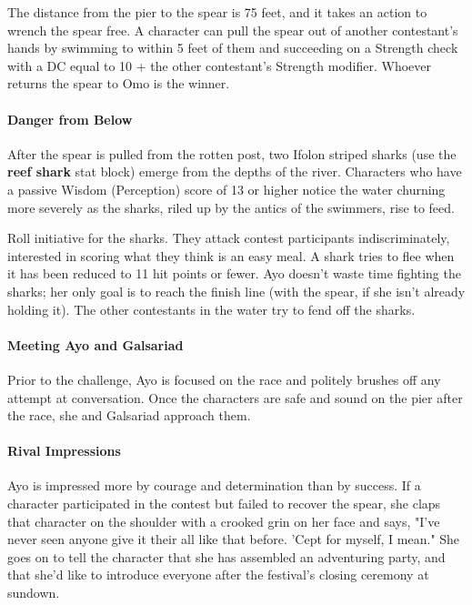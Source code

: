 \documentclass[letterpaper, 11pt, bg=full, twocolumn]{dndbook}
\begin{document}
The distance from the pier to the spear is 75 feet, and it takes an action to wrench the spear free. A character can pull the spear out of another contestant's hands by swimming to within 5 feet of them and succeeding on a Strength check with a DC equal to 10 + the other contestant's Strength modifier. Whoever returns the spear to Omo is the winner.

\paragraph{Danger from Below}

After the spear is pulled from the rotten post, two Ifolon striped sharks (use the \textbf{reef shark} stat block) emerge from the depths of the river. Characters who have a passive Wisdom (Perception) score of 13 or higher notice the water churning more severely as the sharks, riled up by the antics of the swimmers, rise to feed.

Roll initiative for the sharks. They attack contest participants indiscriminately, interested in scoring what they think is an easy meal. A shark tries to flee when it has been reduced to 11 hit points or fewer. Ayo doesn't waste time fighting the sharks; her only goal is to reach the finish line (with the spear, if she isn't already holding it). The other contestants in the water try to fend off the sharks.

\paragraph{Meeting Ayo and Galsariad}

Prior to the challenge, Ayo is focused on the race and politely brushes off any attempt at conversation. Once the characters are safe and sound on the pier after the race, she and Galsariad approach them.

\paragraph{Rival Impressions}

Ayo is impressed more by courage and determination than by success. If a character participated in the contest but failed to recover the spear, she claps that character on the shoulder with a crooked grin on her face and says, "I've never seen anyone give it their all like that before. 'Cept for myself, I mean." She goes on to tell the character that she has assembled an adventuring party, and that she'd like to introduce everyone after the festival's closing ceremony at sundown.
\end{document}

